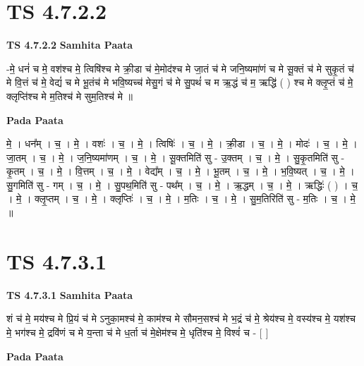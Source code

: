\documentclass[17pt]{extarticle}
\begin{document}
\section*{ TS 4.7.2.2 }

\textbf{TS 4.7.2.2 } \newline
\textbf{Samhita Paata} \newline

-मे॒ धनं॑ च मे॒ वश॑श्च मे॒ त्विषि॑श्च मे क्री॒डा च॑ मे॒मोद॑श्च मे जा॒तं च॑ मे जनि॒ष्यमा॑णं च मे सू॒क्तं च॑ मे सुकृ॒तं च॑ मे वि॒त्तं च॑ मे॒ वेद्यं॑ च मे भू॒तंच॑ मे भवि॒ष्यच्च॑ मेसु॒गं च॑ मे सु॒पथं॑ च म ऋ॒द्धं च॑ म॒ ऋद्धि॑ ( ) श्च मे क्लृ॒प्तं च॑ मे॒    क्लृप्ति॑श्च मे म॒तिश्च॑ मे सुम॒तिश्च॑ मे ॥ \newline

\textbf{Pada Paata} \newline

मे॒ । धन᳚म् । च॒ । मे॒ । वशः॑ । च॒ । मे॒ । त्विषिः॑ । च॒ । मे॒ । क्री॒डा । च॒ । मे॒ । मोदः॑ । च॒ । मे॒ । जा॒तम् । च॒ । मे॒ । ज॒नि॒ष्यमा॑णम् । च॒ । मे॒ । सू॒क्तमिति॑ सु - उ॒क्तम् । च॒ । मे॒ । सु॒कृ॒तमिति॑ सु - कृ॒तम् । च॒ । मे॒ । वि॒त्तम् । च॒ । मे॒ । वेद्य᳚म् । च॒ । मे॒ । भू॒तम् । च॒ । मे॒ । भ॒वि॒ष्यत् । च॒ । मे॒ । सु॒गमिति॑ सु - गम् । च॒ । मे॒ । सु॒पथ॒मिति॑ सु - पथ᳚म् । च॒ । मे॒ । ऋ॒द्धम् । च॒ । मे॒ । ऋद्धिः॑ ( ) । च॒ । मे॒ । क्लृ॒प्तम् । च॒ । मे॒ । क्लृप्तिः॑ । च॒ । मे॒ । म॒तिः । च॒ । मे॒ । सु॒म॒तिरिति॑ सु - म॒तिः । च॒ । मे॒ ॥  \newline




\section*{ TS 4.7.3.1 }

\textbf{TS 4.7.3.1 } \newline
\textbf{Samhita Paata} \newline

शं च॑ मे॒ मय॑श्च मे प्रि॒यं च॑ मे ऽनुका॒मश्च॑ मे॒ काम॑श्च मे     सौमन॒सश्च॑ मे भ॒द्रं च॑ मे॒ श्रेय॑श्च मे॒ वस्य॑श्च मे॒   यश॑श्च मे॒ भग॑श्च मे॒ द्रवि॑णं च मे य॒न्ता च॑ मे ध॒र्ता च॑ मे॒क्षेम॑श्च मे॒ धृति॑श्च मे॒ विश्वं॑ च - [  ] \newline

\textbf{Pada Paata} \newline
\end{document}
